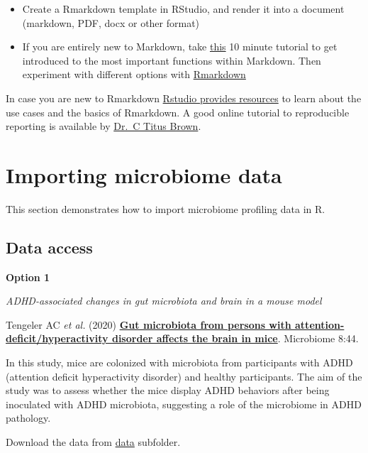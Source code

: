 \documentclass[
]{book}
\begin{document}
\begin{itemize}
\item
  Create a Rmarkdown template in RStudio, and render it into a
  document (markdown, PDF, docx or other format)
\item
  If you are entirely new to Markdown, take
  \href{https://www.markdowntutorial.com/}{this} 10 minute tutorial to get
  introduced to the most important functions within Markdown. Then
  experiment with different options with
  \href{https://www.rstudio.com/wp-content/uploads/2015/02/rmarkdown-cheatsheet.pdf}{Rmarkdown}
\end{itemize}

In case you are new to Rmarkdown \href{https://rmarkdown.rstudio.com/lesson-1.html}{Rstudio provides
resources} to learn
about the use cases and the basics of Rmarkdown. A good online
tutorial to reproducible reporting is available by \href{https://rpubs.com/marschmi/RMarkdown}{Dr.~C Titus
Brown}.

\hypertarget{importing-microbiome-data}{%
\chapter{Importing microbiome data}\label{importing-microbiome-data}}

This section demonstrates how to import microbiome profiling data in R.

\hypertarget{data-access}{%
\section{Data access}\label{data-access}}

\textbf{Option 1}

\emph{ADHD-associated changes in gut microbiota and brain in a mouse model}

Tengeler AC \emph{et
al.} (2020) \href{https://doi.org/10.1186/s40168-020-00816-x}{\textbf{Gut microbiota from persons with
attention-deficit/hyperactivity disorder affects the brain in
mice}}. Microbiome
8:44.

In this study, mice are colonized with microbiota from participants
with ADHD (attention deficit hyperactivity disorder) and healthy
participants. The aim of the study was to assess whether the mice
display ADHD behaviors after being inoculated with ADHD microbiota,
suggesting a role of the microbiome in ADHD pathology.

Download the data from
\href{https://github.com/microbiome/course_2021_radboud/tree/main/data}{data}
subfolder.
\end{document}
